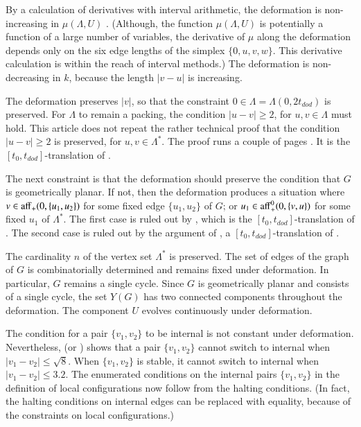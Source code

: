 By a calculation of derivatives with interval arithmetic,
the deformation is non-increasing in $\mu(\Lambda,U)$ \cite[Lemma~7.7]{arx}.  (Although, the function $\mu(\Lambda,U)$ is potentially a 
function of a large number of variables, the derivative of $\mu$
along the deformation depends only on the six edge lengths  of
the simplex $\{0,u,v,w\}$.  This derivative calculation is within
the reach of interval methods.)
The deformation is non-decreasing in $k$, because the length
$|v-u|$ is increasing.

The deformation preserves $|v|$,
so that the constraint $0\in\Lambda=\Lambda(0,2t_{dod})$ is preserved.
For $\Lambda$ to remain a packing,  the condition
 $|u-v|\ge 2$, for $u,v\in \Lambda$ must hold.
This article does not repeat the rather technical proof that
the condition
 $|u-v|\ge 2$ is preserved, for $u,v\in\Lambda^*$.  The proof
runs a couple  of pages \cite[Lemma~7.6]{arx}.
It is the $[t_0,t_{dod}]$-translation of \cite[Lemma~12.20]{DCG}.

The next constraint is that the deformation should preserve the condition
that $G$ is geometrically planar.  
If not, then the deformation produces
a situation where $v\in {\operatorname{aff}}_+(0,\{u_1,u_2\})$ for some fixed edge $\{u_1,u_2\}$
of $G$; or $u_1\in {\operatorname{aff}}_+^0(0,\{v,u\})$ for some fixed $u_1$ of $\Lambda^*$.
The first case is ruled out by \cite[Remark~p.22]{arx}, which is the $[t_0,t_{dod}]$-translation of \cite[\S12.7,p.132]{DCG}.  The second case is ruled out by 
the argument of \cite[p.27]{arx}, a $[t_0,t_{dod}]$-translation of 
\cite[\S12.8,p.134]{DCG}.

The cardinality $n$ of the vertex set $\Lambda^*$ is preserved.
The set of edges of the graph of $G$ is combinatorially determined and
remains fixed under deformation.  In particular, $G$ remains a single
cycle.  Since $G$ is geometrically planar and consists of a single
cycle, the set $Y(G)$ has two connected components throughout the
deformation.  The component $U$ evolves continuously under deformation.   

The condition for a pair $\{v_1,v_2\}$ to be
internal is not constant under deformation.  Nevertheless,
\cite[p.23]{arx} (or \cite[p.132]{DCG}) 
shows that a pair $\{v_1,v_2\}$
cannot switch to internal when $|v_1-v_2| \le \sqrt8$.  When $\{v_1,v_2\}$ is stable,
it cannot switch to internal when $|v_1-v_2|\le 3.2$. 
The enumerated conditions on the
internal pairs $\{v_1,v_2\}$ in the definition of local configurations
now follow from the halting conditions. (In fact, the halting conditions on internal edges
can be replaced with equality, because of the
constraints on local configurations.)

